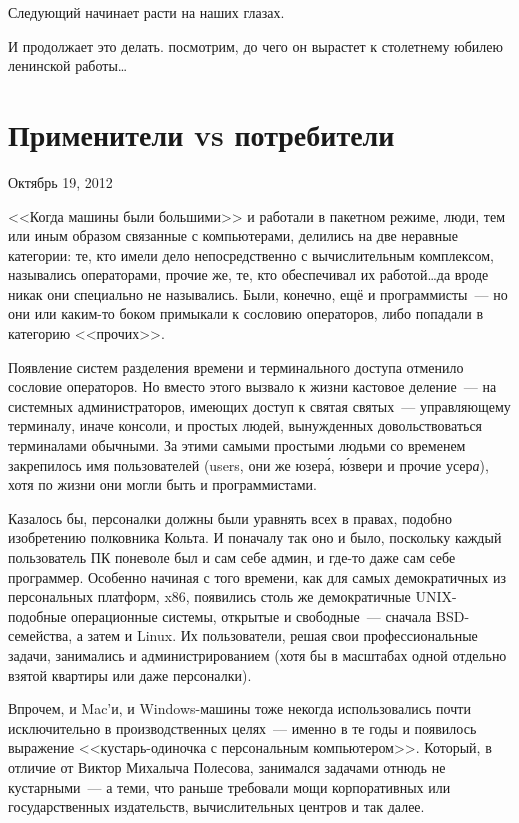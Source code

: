 \begin{shadequote}{}
Следующий начинает расти на наших глазах.
\end{shadequote}

И продолжает это делать. посмотрим, до чего он вырастет к столетнему юбилею ленинской работы\dots

\section{Применители vs потребители}
\hypertarget{customers}{}

\begin{timeline}Октябрь 19, 2012\end{timeline}

<<Когда машины были большими>> и работали в пакетном режиме, люди, тем или иным образом связанные с компьютерами, делились на две неравные категории: те, кто имели дело непосредственно с вычислительным комплексом, назывались операторами, прочие же, те, кто обеспечивал их работой\dots да вроде никак они специально не назывались. Были, конечно, ещё и программисты~--- но они или каким-то боком примыкали к сословию операторов, либо попадали в категорию <<прочих>>.

Появление систем разделения времени и терминального доступа отменило сословие операторов. Но вместо этого вызвало к жизни кастовое деление~--- на системных администраторов, имеющих доступ к святая святых~--- управляющему терминалу, иначе консоли, и простых людей, вынужденных довольствоваться терминалами обычными. За этими самыми простыми людьми со временем закрепилось имя пользователей (users, они же юзер\'{а}, \'{ю}звери и прочие усер\textit{а}), хотя по жизни они могли быть и программистами.

Казалось бы, персоналки должны были уравнять всех в правах, подобно изобретению полковника Кольта. И поначалу так оно и было, поскольку каждый пользователь ПК поневоле был и сам себе админ, и где-то даже сам себе программер. Особенно начиная с того времени, как для самых демократичных из персональных платформ, x86, появились столь же демократичные UNIX-подобные операционные системы, открытые и свободные~--- сначала BSD-семейства, а затем и Linux. Их пользователи, решая свои профессиональные задачи, занимались и администрированием (хотя бы в масштабах одной отдельно взятой квартиры или даже персоналки).

Впрочем, и Mac'и, и Windows-машины тоже некогда использовались почти исключительно в производственных целях~--- именно в те годы и появилось выражение <<кустарь-одиночка с персональным компьютером>>. Который, в отличие от Виктор Михалыча Полесова, занимался задачами отнюдь не кустарными~--- а теми, что раньше требовали мощи корпоративных или государственных издательств, вычислительных центров и так далее.


